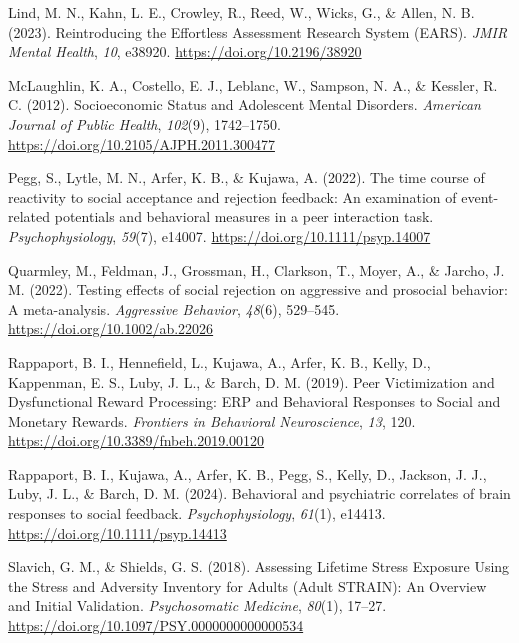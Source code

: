 \documentclass[
  man]{apa7}
\newlength{\cslhangindent}
\newlength{\cslentryspacingunit} %
\newenvironment{CSLReferences}[2] %
 {%
  \setlength{\parindent}{0pt}
  \ifodd #1
  \let\oldpar\par
  \def\par{\hangindent=\cslhangindent\oldpar}
  \fi
  \setlength{\parskip}{#2\cslentryspacingunit}
 }%
 {}
\begin{document}
\begin{CSLReferences}{1}{0}
\leavevmode{}%
Lind, M. N., Kahn, L. E., Crowley, R., Reed, W., Wicks, G., \& Allen, N. B. (2023). Reintroducing the {Effortless Assessment Research System} ({EARS}). \emph{JMIR Mental Health}, \emph{10}, e38920. \url{https://doi.org/10.2196/38920}

\leavevmode{}%
McLaughlin, K. A., Costello, E. J., Leblanc, W., Sampson, N. A., \& Kessler, R. C. (2012). Socioeconomic {Status} and {Adolescent Mental Disorders}. \emph{American Journal of Public Health}, \emph{102}(9), 1742--1750. \url{https://doi.org/10.2105/AJPH.2011.300477}

\leavevmode{}%
Pegg, S., Lytle, M. N., Arfer, K. B., \& Kujawa, A. (2022). The time course of reactivity to social acceptance and rejection feedback: {An} examination of event-related potentials and behavioral measures in a peer interaction task. \emph{Psychophysiology}, \emph{59}(7), e14007. \url{https://doi.org/10.1111/psyp.14007}

\leavevmode{}%
Quarmley, M., Feldman, J., Grossman, H., Clarkson, T., Moyer, A., \& Jarcho, J. M. (2022). Testing effects of social rejection on aggressive and prosocial behavior: {A} meta-analysis. \emph{Aggressive Behavior}, \emph{48}(6), 529--545. \url{https://doi.org/10.1002/ab.22026}

\leavevmode{}%
Rappaport, B. I., Hennefield, L., Kujawa, A., Arfer, K. B., Kelly, D., Kappenman, E. S., Luby, J. L., \& Barch, D. M. (2019). Peer {Victimization} and {Dysfunctional Reward Processing}: {ERP} and {Behavioral Responses} to {Social} and {Monetary Rewards}. \emph{Frontiers in Behavioral Neuroscience}, \emph{13}, 120. \url{https://doi.org/10.3389/fnbeh.2019.00120}

\leavevmode{}%
Rappaport, B. I., Kujawa, A., Arfer, K. B., Pegg, S., Kelly, D., Jackson, J. J., Luby, J. L., \& Barch, D. M. (2024). Behavioral and psychiatric correlates of brain responses to social feedback. \emph{Psychophysiology}, \emph{61}(1), e14413. \url{https://doi.org/10.1111/psyp.14413}

\leavevmode{}%
Slavich, G. M., \& Shields, G. S. (2018). Assessing {Lifetime Stress Exposure Using} the {Stress} and {Adversity Inventory} for {Adults} ({Adult STRAIN}): {An Overview} and {Initial Validation}. \emph{Psychosomatic Medicine}, \emph{80}(1), 17--27. \url{https://doi.org/10.1097/PSY.0000000000000534}


\end{CSLReferences}
\end{document}
